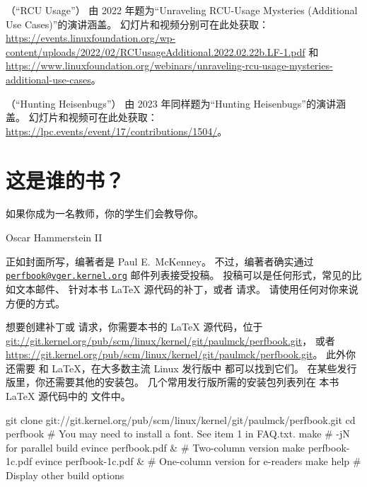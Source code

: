 （``RCU Usage''）
由 2022 年题为``Unraveling RCU-Usage Mysteries
(Additional Use Cases)''的演讲涵盖。
幻灯片和视频分别可在此处获取：
\url{https://events.linuxfoundation.org/wp-content/uploads/2022/02/RCUusageAdditional.2022.02.22b.LF-1.pdf}
和
\url{https://www.linuxfoundation.org/webinars/unraveling-rcu-usage-mysteries-additional-use-cases}。

（``Hunting Heisenbugs''）
由 2023 年同样题为``Hunting Heisenbugs''的演讲涵盖。
幻灯片和视频可在此处获取：
\url{https://lpc.events/event/17/contributions/1504/}。

\section{这是谁的书？}
\label{sec:howto:Whose Book Is This?}
%
\epigraph{如果你成为一名教师，你的学生们会教导你。}
	 {Oscar Hammerstein II}

正如封面所写，编著者是 Paul E.~McKenney。
不过，编著者确实通过
\href{mailto:perfbook@vger.kernel.org}
{\nolinkurl{perfbook@vger.kernel.org}} 邮件列表接受投稿。
投稿可以是任何形式，常见的比如文本邮件、
针对本书 \LaTeX{} 源代码的补丁，或者  请求。
请使用任何对你来说方便的方式。

想要创建补丁或  请求，你需要本书的
\LaTeX{} 源代码，位于
\url{git://git.kernel.org/pub/scm/linux/kernel/git/paulmck/perfbook.git}，
或者
\url{https://git.kernel.org/pub/scm/linux/kernel/git/paulmck/perfbook.git}。
此外你还需要  和 \LaTeX{}，在大多数主流 Linux 发行版中
都可以找到它们。
在某些发行版里，你还需要其他的安装包。
几个常用发行版所需的安装包列表列在
本书 \LaTeX{} 源代码中的  文件中。

\begin{listing}
\begin{VerbatimL}[breaklines=true,breakafter=/,
        breakaftersymbolpre=\raisebox{-.7ex}{\textcolor{darkgray}{\Pisymbol{psy}{191}}},
	breaksymbolleft=\textcolor{darkgray}{\tiny\ensuremath{\hookrightarrow}},
        numbers=none,xleftmargin=0pt]
git clone git://git.kernel.org/pub/scm/linux/kernel/git/paulmck/perfbook.git
cd perfbook
# You may need to install a font. See item 1 in FAQ.txt.
make                     # -jN for parallel build
evince perfbook.pdf &    # Two-column version
make perfbook-1c.pdf
evince perfbook-1c.pdf & # One-column version for e-readers
make help                # Display other build options
\end{VerbatimL}
\caption{创建最新的 PDF}
\label{lst:howto:Creating a Up-To-Date PDF}
\end{listing}

